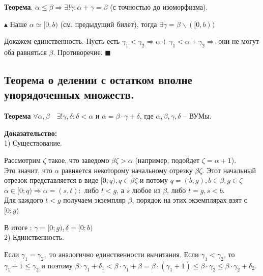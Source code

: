 \textbf{Теорема}. $\alpha \leqslant \beta \Rightarrow \exists! \gamma: \alpha + \gamma = \beta$ (с точностью до изоморфизма).

$\blacktriangle$
Наше $\alpha \simeq [0, b)$ (см. предыдущий билет), тогда $\exists \gamma = \beta \backslash ([0, b))$

Докажем единственность. Пусть есть $\gamma_1 < \gamma_2 \Rightarrow \alpha + \gamma_1 < \alpha + \gamma_2 \Rightarrow$ они не могут оба равняться $\beta$. Противоречие.
$\blacksquare$

\subsection{Теорема о делении с остатком вполне упорядоченных множеств.}

\textbf{Теорема} $\forall \alpha, \beta \quad \exists ! \gamma, \delta : \delta < \alpha$ и $\alpha = \beta \cdot \gamma + \delta$, где $\alpha, \beta, \gamma, \delta$ -- ВУМы.

\textbf{Доказательство:}\\

1) Существование.

Рассмотрим $\zeta$ такое, что заведомо $\beta \zeta > \alpha$ (например, подойдет $\zeta = \alpha + 1$).\\

Это значит, что $\alpha$ равняется некоторому начальному отрезку $\beta \zeta$. Этот начальный отрезок представляется в виде $[0;q), q \in \beta \zeta$ и потому $q = (b, g), b \in \beta, g \in \zeta$\\

$\alpha \in [0;q) \Rightarrow \alpha = (s, t) :$ либо $t < g$, а $s$ любое из $\beta$, либо $t = g, s < b$.\\

Для каждого $t < g$ получаем экземпляр $\beta$, порядок на этих экземплярах взят с $[0;g)$

В итоге : $\gamma = [0;g), \delta = [0;b)$\\

2) Единственность.

Если $\gamma_1 = \gamma_2,$ то аналогично единственности вычитания.
Если $\gamma_1 < \gamma_2$, то $\gamma_1 + 1 \leq \gamma_2$ и поэтому $\beta \cdot \gamma_1 + \delta_1 < \beta \cdot \gamma_1 + \beta = \beta \cdot (\gamma_1 + 1) \leq \beta \cdot \gamma_2 \leq \beta \cdot \gamma_2 + \delta_2$.

